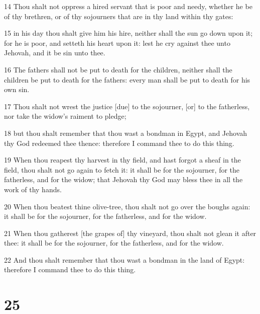 \par 14 Thou shalt not oppress a hired servant that is poor and needy, whether he be of thy brethren, or of thy sojourners that are in thy land within thy gates:
\par 15 in his day thou shalt give him his hire, neither shall the sun go down upon it; for he is poor, and setteth his heart upon it: lest he cry against thee unto Jehovah, and it be sin unto thee.
\par 16 The fathers shall not be put to death for the children, neither shall the children be put to death for the fathers: every man shall be put to death for his own sin.
\par 17 Thou shalt not wrest the justice [due] to the sojourner, [or] to the fatherless, nor take the widow's raiment to pledge;
\par 18 but thou shalt remember that thou wast a bondman in Egypt, and Jehovah thy God redeemed thee thence: therefore I command thee to do this thing.
\par 19 When thou reapest thy harvest in thy field, and hast forgot a sheaf in the field, thou shalt not go again to fetch it: it shall be for the sojourner, for the fatherless, and for the widow; that Jehovah thy God may bless thee in all the work of thy hands.
\par 20 When thou beatest thine olive-tree, thou shalt not go over the boughs again: it shall be for the sojourner, for the fatherless, and for the widow.
\par 21 When thou gatherest [the grapes of] thy vineyard, thou shalt not glean it after thee: it shall be for the sojourner, for the fatherless, and for the widow.
\par 22 And thou shalt remember that thou wast a bondman in the land of Egypt: therefore I command thee to do this thing.

\chapter{25}

